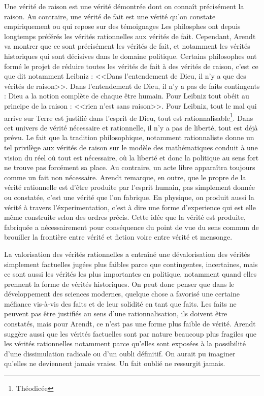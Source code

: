 \documentclass[12pt]{article}
\begin{document}
Une vérité de raison est une vérité démontrée dont on connaît précisément la raison.
Au contraire, une vérité de fait est une vérité qu'on constate empiriquement ou qui repose sur des témoignages
Les philosphes ont depuis longtemps préférés les vérités rationnelles aux vérités de fait.
Cependant, Arendt va montrer que ce sont précisément les vérités de fait, et notamment les vérités historiques qui sont décisives dans le domaine politique.
Certains philosophes ont formé le projet de réduire toutes les vérités de fait à des vérités de raison, c'est ce que dit notamment Leibniz : <<Dans l'entendement de Dieu, il n'y a que des vérités de raison>>.
Dans l'entendement de Dieu, il n'y a pas de faits contingents : Dieu a la notion complète de chaque être humain. Pour Leibniz tout obéit au principe de la raison : <<rien n'est sans raison>>.
Pour Leibniz, tout le mal qui arrive sur Terre est justifié dans l'esprit de Dieu, tout est rationnalisable\footnote{Théodicée}.
Dans cet univers de vérité nécessaire et rationnelle, il n'y a pas de liberté, tout est déjà prévu.
Le fait que la tradition philosophique, notamment rationnaliste donne un tel privilège aux vérités de raison sur le modèle des mathématiques conduit à une vision du réel où tout est nécessaire, où la liberté et donc la politique au sens fort ne trouve pas forcément sa place.
Au contraire, un acte libre apparaîtra toujours comme un fait non nécessaire.
Arendt remarque, en outre, que le propre de la vérité rationnelle est d'être produite par l'esprit humain, pas simplement donnée ou constatée, c'est une vérité que l'on fabrique.
En physique, on produit aussi la vérité à travers l'éxperimentation, c'est à dire une forme d'experience qui est elle même construite selon des ordres précis.
Cette idée que la vérité est produite, fabriquée a nécessairement pour conséquence du point de vue du sens commun de brouiller la frontière entre vérité et fiction voire entre vérité et mensonge.

La valorisation des vérités rationnelles a entraîné une dévalorisation des vérités simplement factuelles jugées plus faibles parce que contingentes, incertaines, mais ce sont aussi les vérités les plus importantes en politique, notamment quand elles prennent la forme de vérités historiques.
On peut donc penser que dans le développement des sciences modernes, quelque chose a favorisé une certaine méfiance vis-à-vis des faits et de leur solidité en tant que faits.
Les faits ne peuvent pas être justifiés au sens d'une rationnalisation, ils doivent être constatés, mais pour Arendt, ce n'est pas une forme plus faible de vérité.
Arendt suggère aussi que les vérités factuelles sont par nature beaucoup plus fragiles que les vérités rationnelles notamment parce qu'elles sont exposées à la possibilité d'une dissimulation radicale ou d'un oubli définitif.
On aurait pu imaginer qu'elles ne deviennent jamais vraies.
Un fait oublié ne ressurgit jamais.
\end{document}
